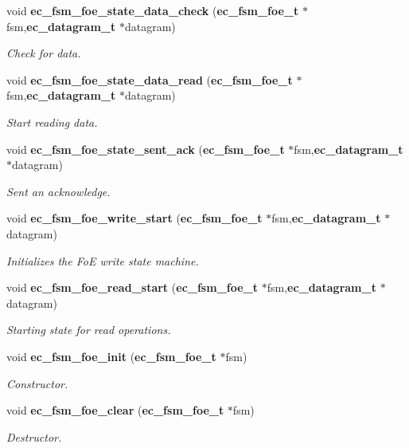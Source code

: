 \begin{DoxyCompactItemize}
void {\bf ec\-\_\-fsm\-\_\-foe\-\_\-state\-\_\-data\-\_\-check} ({\bf ec\-\_\-fsm\-\_\-foe\-\_\-t} $\ast$fsm,{\bf ec\-\_\-datagram\-\_\-t} $\ast$datagram)
\begin{DoxyCompactList}\small\item\em \-Check for data. \end{DoxyCompactList}\item 
void {\bf ec\-\_\-fsm\-\_\-foe\-\_\-state\-\_\-data\-\_\-read} ({\bf ec\-\_\-fsm\-\_\-foe\-\_\-t} $\ast$fsm,{\bf ec\-\_\-datagram\-\_\-t} $\ast$datagram)
\begin{DoxyCompactList}\small\item\em \-Start reading data. \end{DoxyCompactList}\item 
void {\bf ec\-\_\-fsm\-\_\-foe\-\_\-state\-\_\-sent\-\_\-ack} ({\bf ec\-\_\-fsm\-\_\-foe\-\_\-t} $\ast$fsm,{\bf ec\-\_\-datagram\-\_\-t} $\ast$datagram)
\begin{DoxyCompactList}\small\item\em \-Sent an acknowledge. \end{DoxyCompactList}\item 
void {\bf ec\-\_\-fsm\-\_\-foe\-\_\-write\-\_\-start} ({\bf ec\-\_\-fsm\-\_\-foe\-\_\-t} $\ast$fsm,{\bf ec\-\_\-datagram\-\_\-t} $\ast$datagram)
\begin{DoxyCompactList}\small\item\em \-Initializes the \-Fo\-E write state machine. \end{DoxyCompactList}\item 
void {\bf ec\-\_\-fsm\-\_\-foe\-\_\-read\-\_\-start} ({\bf ec\-\_\-fsm\-\_\-foe\-\_\-t} $\ast$fsm,{\bf ec\-\_\-datagram\-\_\-t} $\ast$datagram)
\begin{DoxyCompactList}\small\item\em \-Starting state for read operations. \end{DoxyCompactList}\item 
void {\bf ec\-\_\-fsm\-\_\-foe\-\_\-init} ({\bf ec\-\_\-fsm\-\_\-foe\-\_\-t} $\ast$fsm)
\begin{DoxyCompactList}\small\item\em \-Constructor. \end{DoxyCompactList}\item 
void {\bf ec\-\_\-fsm\-\_\-foe\-\_\-clear} ({\bf ec\-\_\-fsm\-\_\-foe\-\_\-t} $\ast$fsm)
\begin{DoxyCompactList}\small\item\em \-Destructor. \end{DoxyCompactList}\item 

\end{DoxyCompactItemize}
